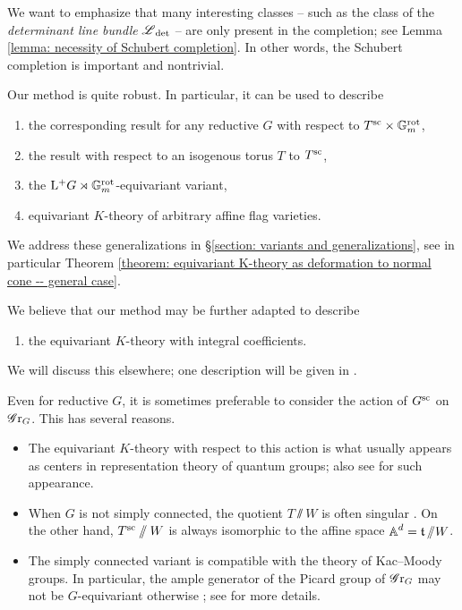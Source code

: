 \begin{remark}
We want to emphasize that many interesting classes -- such as the class of the \textit{determinant line bundle} $\eL_{\det}$ -- are only present in the completion; see Lemma \ref{lemma: necessity of Schubert completion}. In other words, the Schubert completion is important and nontrivial.
\end{remark}

\begin{remark}\label{remark: variant of the K-theory of affine Grassmannian}
Our method is quite robust. In particular, it can be used to describe
    \begin{enumerate}
        \item[(1)] the corresponding result for any reductive $G$ with respect to $T^{\sc} \times \Gm^{\rot}$, 
        \item[(2)] the result with respect to an isogenous torus $T$ to $T^{\sc}$,
        \item[(3)] the $\lop G \rtimes \Gm^{\rot}$-equivariant variant,
        \item[(4)] equivariant $K$-theory of arbitrary affine flag varieties.
    \end{enumerate}    
We address these generalizations in \S \ref{section: variants and generalizations}, see in particular Theorem \ref{theorem: equivariant K-theory as deformation to normal cone -- general case}.
\end{remark}

\begin{remark}
We believe that our method may be further adapted to describe
    \begin{enumerate}
        \item[(5)] the equivariant $K$-theory with integral coefficients.
    \end{enumerate}
We will discuss this elsewhere; one description will be given in \cite{HL25}.
\end{remark}


\begin{remark}
Even for reductive $G$, it is sometimes preferable to consider the action of $G^{\sc}$ on $\Gr_G$. This has several reasons.
\begin{itemize}
    \item The equivariant $K$-theory with respect to this action is what usually appears as centers in representation theory of quantum groups; also see \cite{CK18} for such appearance.
    \item When $G$ is not simply connected, the quotient $T \sslash W$ is often singular \cite[\S 7]{BZ00}. On the other hand, $T^{\sc} \sslash W$ is always isomorphic to the affine space $\A^d = \t \sslash W$. 
    \item The simply connected variant is compatible with the theory of Kac--Moody groups. In particular, the ample generator of the Picard group of $\Gr_G$ may not be $G$-equivariant otherwise \cite[\S 3.2]{CK18}; see \cite[Remarks 4.3 and 5.8]{YZ09} for more details.
\end{itemize}
\end{remark}

